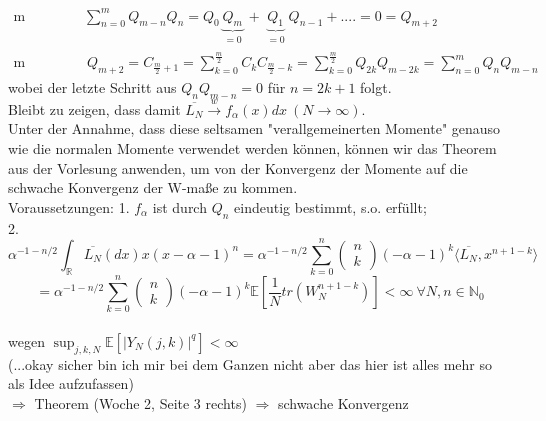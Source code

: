 \documentclass[a4paper, 11pt]{scrreprt}
\newcommand{\RR}{\mathbb{R}}
\newcommand{\EE}{\mathbb{E}}
\newcommand{\NN}{\mathbb{N}}
\begin{document}
\begin{align*}
\text{m ungerade:}& \sum_{n=0}^m Q_{m-n}Q_n= Q_0 \underbrace{Q_m}_{\substack{=0}} + \underbrace{Q_1}_{\substack{=0}}Q_{n-1}+....= 0=Q_{m+2}\\
\text {m gerade:}&~ Q_{m+2}= C_{\frac{m}{2}+1}= \sum_{k=0}^{\frac{m}{2}} C_k C_{\frac{m}{2}-k}=\sum_{k=0}^{\frac{m}{2}} Q_{2k}Q_{m-2k}=\sum_{n=0}^{m}Q_n Q_{m-n}
\end{align*}
wobei der letzte Schritt aus $ Q_n Q_{m-n}=0 $ für $ n=2k+1 $ folgt.\\

Bleibt zu zeigen, dass damit $ \overline{L_N} \overset{w}{\rightarrow} f_\alpha (x)dx~(N \rightarrow \infty) $. \\
Unter der Annahme, dass diese seltsamen "verallgemeinerten Momente" genauso wie die normalen Momente verwendet werden können, können wir das Theorem aus der Vorlesung anwenden, um von der Konvergenz der Momente auf die schwache Konvergenz der W-maße zu kommen. \\
Voraussetzungen: 1. $ f_\alpha $ ist durch $ Q_n $ eindeutig bestimmt, s.o. erfüllt;\\
2. \[ \alpha^{-1-n/2} \int_{\RR}\overline{L_{N}}(dx)x(x-\alpha-1)^{n} = \alpha^{-1-n/2}\sum_{k=0}^n \begin{pmatrix} n\\k\end{pmatrix} (-\alpha -1)^k \langle \overline{L_N}, x^{n+1-k} \rangle \] 
\[= \alpha^{-1-n/2}\sum_{k=0}^n \begin{pmatrix} n\\k\end{pmatrix} (-\alpha -1)^k \EE [\dfrac{1}{N} tr(W_N^{n+1-k})]
< \infty ~\forall N,n \in \NN_0 \]\\
wegen $ \sup_{j,k,N} \EE[\vert Y_N(j,k)\vert ^{q}]< \infty$ \\
(...okay sicher bin ich mir bei dem Ganzen nicht aber das hier ist alles mehr so als Idee aufzufassen)\\
$ \Rightarrow $ Theorem (Woche 2, Seite 3 rechts) $ \Rightarrow $ schwache Konvergenz
\end{document}
